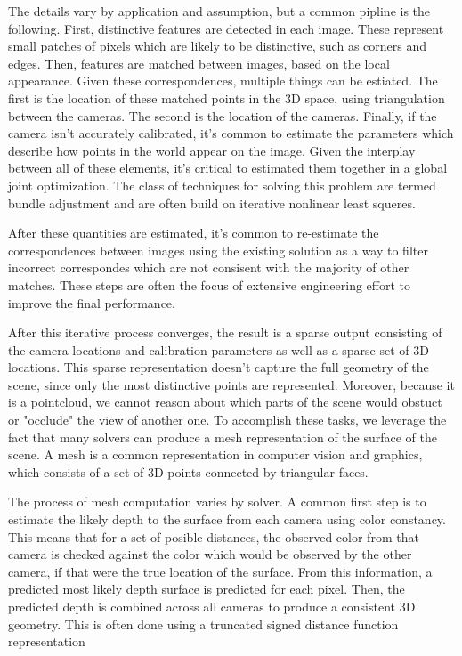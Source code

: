The details vary by application and assumption, but a common pipline is the following. First, distinctive features are detected in each image. These represent small patches of pixels which are likely to be distinctive, such as corners and edges. Then, features are matched between images, based on the local appearance. 
Given these correspondences, multiple things can be estiated. The first is the location of these matched points in the 3D space, using triangulation between the cameras. The second is the location of the cameras. Finally, if the camera isn't accurately calibrated, it's common to estimate the parameters which describe how points in the world appear on the image. Given the interplay between all of these elements, it's critical to estimated them together in a global joint optimization. The class of techniques for solving this problem are termed bundle adjustment and are often build on iterative nonlinear least squeres. 

After these quantities are estimated, it's common to re-estimate the correspondences between images using the existing solution as a way to filter incorrect correspondes which are not consisent with the majority of other matches. These steps are often the focus of extensive engineering effort to improve the final performance. 

After this iterative process converges, the result is a sparse output consisting of the camera locations and calibration parameters as well as a sparse set of 3D locations. This sparse representation doesn't capture the full geometry of the scene, since only the most distinctive points are represented. Moreover, because it is a pointcloud, we cannot reason about which parts of the scene would obstuct or "occlude" the view of another one. To accomplish these tasks, we leverage the fact that many solvers can produce a mesh representation of the surface of the scene. A mesh is a common representation in computer vision and graphics, which consists of a set of 3D points connected by triangular faces. 

The process of mesh computation varies by solver. A common first step is to estimate the likely depth to the surface from each camera using color constancy. This means that for a set of posible distances, the observed color from that camera is checked against the color which would be observed by the other camera, if that were the true location of the surface. From this information, a predicted most likely depth surface is predicted for each pixel. Then, the predicted depth is combined across all cameras to produce a consistent 3D geometry. This is often done using a truncated signed distance function representation \cite{} 

